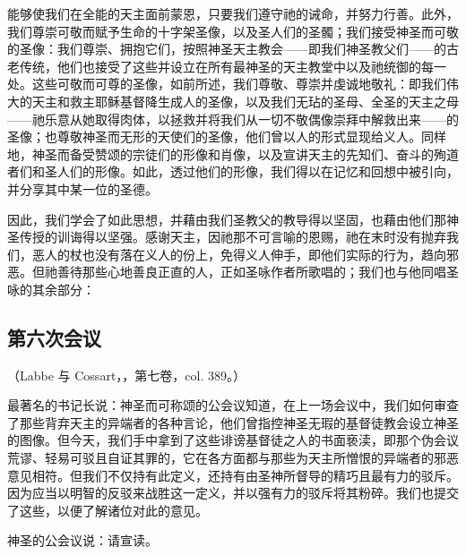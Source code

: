 能够使我们在全能的天主面前蒙恩，只要我们遵守祂的诫命，并努力行善。此外，我们尊崇可敬而赋予生命的十字架圣像，以及圣人们的圣髑；我们接受神圣而可敬的圣像：我们尊崇、拥抱它们，按照神圣天主教会——即我们神圣教父们——的古老传统，他们也接受了这些并设立在所有最神圣的天主教堂中以及祂统御的每一处。这些可敬而可尊的圣像，如前所述，我们尊敬、尊崇并虔诚地敬礼：即我们伟大的天主和救主耶稣基督降生成人的圣像，以及我们无玷的圣母、全圣的天主之母——祂乐意从她取得肉体，以拯救并将我们从一切不敬偶像崇拜中解救出来——的圣像；也尊敬神圣而无形的天使们的圣像，他们曾以人的形式显现给义人。同样地，神圣而备受赞颂的宗徒们的形像和肖像，以及宣讲天主的先知们、奋斗的殉道者们和圣人们的形像。如此，透过他们的形像，我们得以在记忆和回想中被引向，并分享其中某一位的圣德。\par

因此，我们学会了如此思想，并藉由我们圣教父的教导得以坚固，也藉由他们那神圣传授的训诲得以坚强。感谢天主，因祂那不可言喻的恩赐，祂在末时没有抛弃我们，恶人的杖也没有落在义人的份上，免得义人伸手，即他们实际的行为，趋向邪恶。但祂善待那些心地善良正直的人，正如圣咏作者所歌唱的；我们也与他同唱圣咏的其余部分：\par

\par


\subsection{第六次会议}

（Labbe 与 Cossart，，第七卷，col. 389。）\par

最著名的书记长说：神圣而可称颂的公会议知道，在上一场会议中，我们如何审查了那些背弃天主的异端者的各种言论，他们曾指控神圣无瑕的基督徒教会设立神圣的图像。但今天，我们手中拿到了这些诽谤基督徒之人的书面亵渎，即那个伪会议荒谬、轻易可驳且自证其罪的，它在各方面都与那些为天主所憎恨的异端者的邪恶意见相符。但我们不仅持有此定义，还持有由圣神所督导的精巧且最有力的驳斥。因为应当以明智的反驳来战胜这一定义，并以强有力的驳斥将其粉碎。我们也提交了这些，以便了解诸位对此的意见。\par

神圣的公会议说：请宣读。\par

